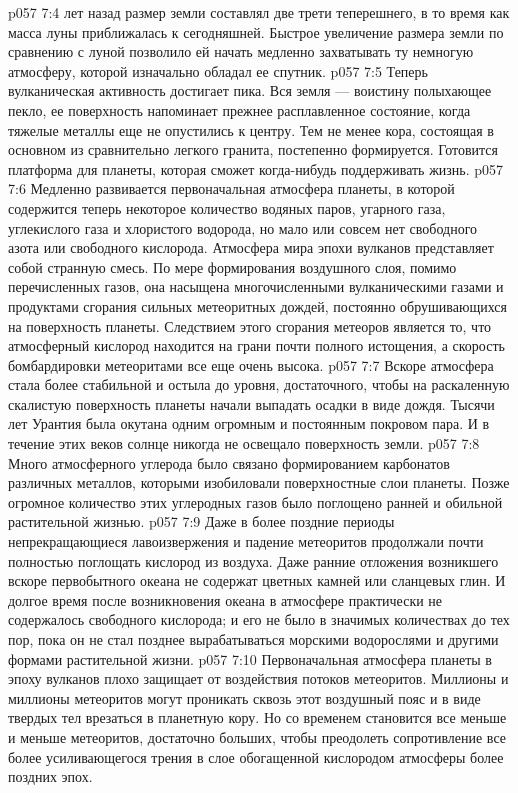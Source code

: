 \vs p057 7:4 \pc {} лет назад размер земли составлял две трети теперешнего, в то время как масса луны приближалась к сегодняшней. Быстрое увеличение размера земли по сравнению с луной позволило ей начать медленно захватывать ту немногую атмосферу, которой изначально обладал ее спутник.
\vs p057 7:5 Теперь вулканическая активность достигает пика. Вся земля --- воистину полыхающее пекло, ее поверхность напоминает прежнее расплавленное состояние, когда тяжелые металлы еще не опустились к центру.  Тем не менее кора, состоящая в основном из сравнительно легкого гранита, постепенно формируется. Готовится платформа для планеты, которая сможет когда\hyp{}нибудь поддерживать жизнь.
\vs p057 7:6 \pc Медленно развивается первоначальная атмосфера планеты, в которой содержится теперь некоторое количество водяных паров, угарного газа, углекислого газа и хлористого водорода, но мало или совсем нет свободного азота или свободного кислорода. Атмосфера мира эпохи вулканов представляет собой странную смесь. По мере формирования воздушного слоя, помимо перечисленных газов, она насыщена многочисленными вулканическими газами и продуктами сгорания сильных метеоритных дождей, постоянно обрушивающихся на поверхность планеты. Следствием этого сгорания метеоров является то, что атмосферный кислород находится на грани почти полного истощения, а скорость бомбардировки метеоритами все еще очень высока.
\vs p057 7:7 \pc Вскоре атмосфера стала более стабильной и остыла до уровня, достаточного, чтобы на раскаленную скалистую поверхность планеты начали выпадать осадки в виде дождя. Тысячи лет Урантия была окутана одним огромным и постоянным покровом пара. И в течение этих веков солнце никогда не освещало поверхность земли.
\vs p057 7:8 Много атмосферного углерода было связано формированием карбонатов различных металлов, которыми изобиловали поверхностные слои планеты. Позже огромное количество этих углеродных газов было поглощено ранней и обильной растительной жизнью.
\vs p057 7:9 Даже в более поздние периоды непрекращающиеся лавоизвержения и падение метеоритов продолжали почти полностью поглощать кислород из воздуха. Даже ранние отложения возникшего вскоре первобытного океана не содержат цветных камней или сланцевых глин. И долгое время после возникновения океана в атмосфере практически не содержалось свободного кислорода; и его не было в значимых количествах до тех пор, пока он не стал позднее вырабатываться морскими водорослями и другими формами растительной жизни.
\vs p057 7:10 Первоначальная атмосфера планеты в эпоху вулканов плохо защищает от воздействия потоков метеоритов. Миллионы и миллионы метеоритов могут проникать сквозь этот воздушный пояс и в виде твердых тел врезаться в планетную кору. Но со временем становится все меньше и меньше метеоритов, достаточно больших, чтобы преодолеть сопротивление все более усиливающегося трения в слое обогащенной кислородом атмосферы более поздних эпох.
